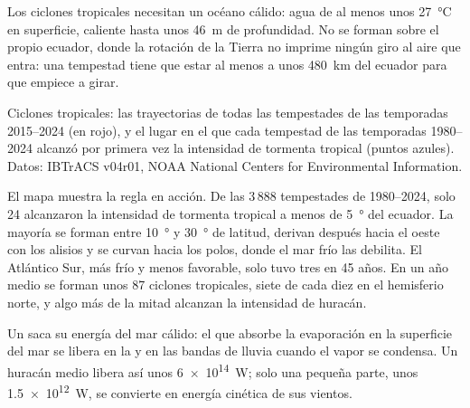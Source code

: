 Los ciclones tropicales necesitan un océano cálido: agua de al menos unos
\qty{27}{\degreeCelsius} en superficie, caliente hasta unos \qty{46}{m} de
profundidad. No se forman sobre el propio ecuador, donde la rotación de la
Tierra no imprime ningún giro al aire que entra: una tempestad tiene que
estar al menos a unos \qty{480}{km} del ecuador para que empiece a girar.

\begin{omfigure}

{\small Ciclones tropicales: las trayectorias de todas las tempestades de las
temporadas 2015--2024 (en rojo), y el lugar en el que cada tempestad de las
temporadas 1980--2024 alcanzó por primera vez la intensidad de tormenta
tropical (puntos azules). Datos: IBTrACS v04r01, NOAA National Centers for
Environmental Information.}
\end{omfigure}

El mapa muestra la regla en acción. De las 3\,888 tempestades de 1980--2024,
solo 24 alcanzaron la intensidad de tormenta tropical a menos de
\qty{5}{\degree} del ecuador. La mayoría se forman entre \qty{10}{\degree} y
\qty{30}{\degree} de latitud, derivan después hacia el oeste con los alisios
y se curvan hacia los polos, donde el mar frío las debilita. El Atlántico
Sur, más frío y menos favorable, solo tuvo tres en 45 años. En un año medio
se forman unos 87 ciclones tropicales, siete de cada diez en el hemisferio
norte, y algo más de la mitad alcanzan la intensidad de huracán.

\begin{proposition}\label{prop:g10:storms-and-cyclones:energy}
Un  saca su energía del mar cálido: el  que
absorbe la evaporación en la superficie del mar se libera en la  y en las bandas de lluvia cuando el vapor se condensa. Un huracán medio
libera así unos \qty{6e14}{W}; solo una pequeña parte, unos
\qty{1.5e12}{W}, se convierte en energía cinética de sus vientos.
\end{proposition}

